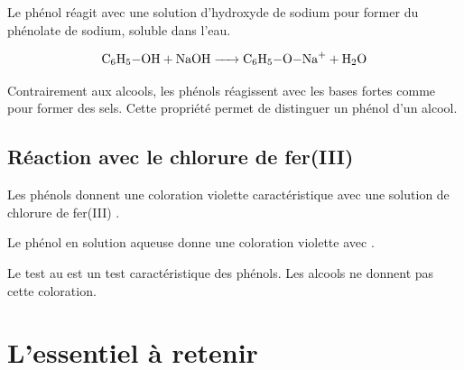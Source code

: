 \begin{experience}
Le phénol réagit avec une solution d'hydroxyde de sodium pour former du phénolate de sodium, soluble dans l'eau.
\end{experience}

\begin{exemple}
\[\ce{C6H5-OH + NaOH -> C6H5-O-Na+ + H2O}\]
\end{exemple}

\begin{remarque}
Contrairement aux alcools, les phénols réagissent avec les bases fortes comme  pour former des sels. Cette propriété permet de distinguer un phénol d'un alcool.
\end{remarque}

\subsection{Réaction avec le chlorure de fer(III)}

\begin{experience}
Les phénols donnent une coloration violette caractéristique avec une solution de chlorure de fer(III) .
\end{experience}

\begin{exemple}
Le phénol en solution aqueuse donne une coloration violette avec .
\end{exemple}

\begin{aretenir}
Le test au  est un test caractéristique des phénols. Les alcools ne donnent pas cette coloration.
\end{aretenir}

\section{L'essentiel à retenir}

